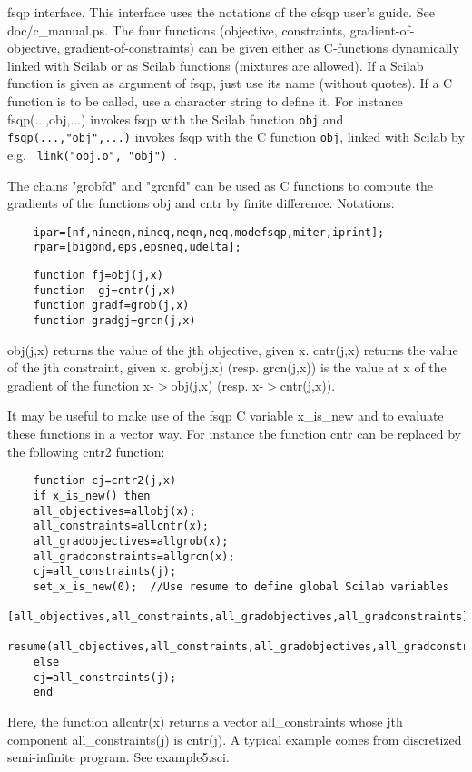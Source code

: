 \begin{mandescription}
  
  fsqp interface. This interface uses the notations of the cfsqp
  user's guide. See doc/c\_manual.ps.
  The four functions (objective, constraints, gradient-of-objective,
  gradient-of-constraints) can be given either as C-functions dynamically
  linked with Scilab or as Scilab functions (mixtures are allowed).
  If a Scilab function is given as argument of fsqp, 
  just use its name (without quotes). If a C function is to be called,
  use a character string to define it. For instance fsqp(...,obj,...)
  invokes fsqp with the Scilab function \verb!obj! and
  \verb!fsqp(...,"obj",...)! invokes fsqp with the C function 
  \verb!obj!, linked with Scilab by e.g. \verb! link("obj.o", "obj") !.
  
  The chains "grobfd" and "grcnfd" can be used as C functions to compute
  the gradients of the functions obj and cntr by finite difference.
  Notations:
  
  \begin{Verbatim}
    ipar=[nf,nineqn,nineq,neqn,neq,modefsqp,miter,iprint];
    rpar=[bigbnd,eps,epsneq,udelta];
  \end{Verbatim}

  \begin{Verbatim}
    function fj=obj(j,x)
    function  gj=cntr(j,x)
    function gradf=grob(j,x)
    function gradgj=grcn(j,x)
  \end{Verbatim}

  obj(j,x) returns the value of the jth objective, given x.
  cntr(j,x) returns the value of the jth constraint, given x.
  grob(j,x) (resp. grcn(j,x)) is the value at x of the gradient of the 
  function x-$>$obj(j,x) (resp.  x-$>$cntr(j,x)).
  
  It may be useful to make use of the fsqp C variable x\_is\_new and to
  evaluate these functions in a vector way. For instance the function
  cntr can be replaced by the following cntr2 function:
  
  \begin{Verbatim}
    function cj=cntr2(j,x)
    if x_is_new() then
    all_objectives=allobj(x);
    all_constraints=allcntr(x);
    all_gradobjectives=allgrob(x);
    all_gradconstraints=allgrcn(x);
    cj=all_constraints(j);
    set_x_is_new(0);  //Use resume to define global Scilab variables
    [all_objectives,all_constraints,all_gradobjectives,all_gradconstraints]=....
    resume(all_objectives,all_constraints,all_gradobjectives,all_gradconstraints);
    else
    cj=all_constraints(j);
    end
  \end{Verbatim}

  Here, the function allcntr(x) returns a vector all\_constraints whose
  jth component all\_constraints(j) is cntr(j).
  A typical example comes from discretized semi-infinite program. 
  See example5.sci.
  
\end{mandescription}

